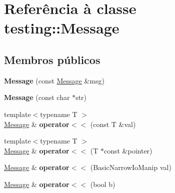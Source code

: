 \hypertarget{classtesting_1_1Message}{\section{Referência à classe testing\-:\-:Message}
\label{classtesting_1_1Message}
}
\subsection*{Membros públicos}
\begin{DoxyCompactItemize}
\item 
\hypertarget{classtesting_1_1Message_ac126e24804817a053bebba0920d94a11}{{\bfseries Message} (const \hyperlink{classtesting_1_1Message}{Message} \&msg)}\label{classtesting_1_1Message_ac126e24804817a053bebba0920d94a11}

\item 
\hypertarget{classtesting_1_1Message_a9de694ca239486809fc99fbbea8ac21d}{{\bfseries Message} (const char $\ast$str)}\label{classtesting_1_1Message_a9de694ca239486809fc99fbbea8ac21d}

\item 
\hypertarget{classtesting_1_1Message_a2e0e71be52d54c20a75a55fca812721f}{{\footnotesize template$<$typename T $>$ }\\\hyperlink{classtesting_1_1Message}{Message} \& {\bfseries operator$<$$<$} (const T \&val)}\label{classtesting_1_1Message_a2e0e71be52d54c20a75a55fca812721f}

\item 
\hypertarget{classtesting_1_1Message_aa3ab685879958f90d2d8cd5b68d10c34}{{\footnotesize template$<$typename T $>$ }\\\hyperlink{classtesting_1_1Message}{Message} \& {\bfseries operator$<$$<$} (T $\ast$const \&pointer)}\label{classtesting_1_1Message_aa3ab685879958f90d2d8cd5b68d10c34}

\item 
\hypertarget{classtesting_1_1Message_a3a71a1c1c8ea52de5852d75483d41453}{\hyperlink{classtesting_1_1Message}{Message} \& {\bfseries operator$<$$<$} (Basic\-Narrow\-Io\-Manip val)}\label{classtesting_1_1Message_a3a71a1c1c8ea52de5852d75483d41453}

\item 
\hypertarget{classtesting_1_1Message_a3e1e04f23b1bdfe18adfd59928296346}{\hyperlink{classtesting_1_1Message}{Message} \& {\bfseries operator$<$$<$} (bool b)}\label{classtesting_1_1Message_a3e1e04f23b1bdfe18adfd59928296346}


\end{DoxyCompactItemize}
